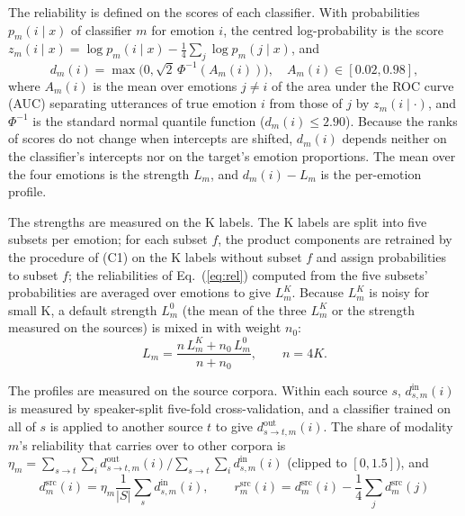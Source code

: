 The reliability is defined on the scores of each classifier. With probabilities $p_m(i\mid x)$ of classifier $m$ for emotion $i$, the centred log-probability is the score $z_m(i\mid x)=\log p_m(i\mid x)-\frac14\sum_j\log p_m(j\mid x)$, and
\begin{equation}\label{eq:rel}
d_m(i)=\max\!\big(0,\sqrt2\,\Phi^{-1}(A_m(i))\big),\quad A_m(i)\in[0.02,0.98],
\end{equation}
where $A_m(i)$ is the mean over emotions $j\neq i$ of the area under the ROC curve (AUC) separating utterances of true emotion $i$ from those of $j$ by $z_m(i\mid\cdot)$, and $\Phi^{-1}$ is the standard normal quantile function ($d_m(i)\le 2.90$). Because the ranks of scores do not change when intercepts are shifted, $d_m(i)$ depends neither on the classifier's intercepts nor on the target's emotion proportions. The mean over the four emotions is the strength $L_m$, and $d_m(i)-L_m$ is the per-emotion profile.

The strengths are measured on the K labels. The K labels are split into five subsets per emotion; for each subset $f$, the product components are retrained by the procedure of (C1) on the K labels without subset $f$ and assign probabilities to subset $f$; the reliabilities of Eq.~(\ref{eq:rel}) computed from the five subsets' probabilities are averaged over emotions to give $L^{K}_m$. Because $L^{K}_m$ is noisy for small K, a default strength $L^{0}_m$ (the mean of the three $L^{K}_m$ or the strength measured on the sources) is mixed in with weight $n_0$:
\begin{equation}
L_m=\frac{n\,L^{K}_m+n_0\,L^{0}_m}{n+n_0},\qquad n=4K.
\end{equation}

The profiles are measured on the source corpora. Within each source $s$, $d^{\mathrm{in}}_{s,m}(i)$ is measured by speaker-split five-fold cross-validation, and a classifier trained on all of $s$ is applied to another source $t$ to give $d^{\mathrm{out}}_{s\to t,m}(i)$. The share of modality $m$'s reliability that carries over to other corpora is $\eta_m=\sum_{s\to t}\sum_i d^{\mathrm{out}}_{s\to t,m}(i)/\sum_{s\to t}\sum_i d^{\mathrm{in}}_{s,m}(i)$ (clipped to $[0,1.5]$), and
\begin{equation}
d^{\mathrm{src}}_m(i)=\eta_m\frac{1}{|S|}\sum_s d^{\mathrm{in}}_{s,m}(i),\qquad r^{\mathrm{src}}_m(i)=d^{\mathrm{src}}_m(i)-\frac14\sum_j d^{\mathrm{src}}_m(j)
\end{equation}

